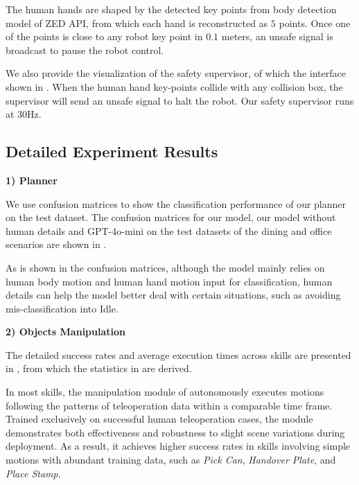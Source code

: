 The human hands are shaped by the detected key points from body detection model of ZED API, from which each hand is reconstructed as $5$ points.
Once one of the points is close to any robot key point in $0.1$ meters, an unsafe signal is broadcast to pause the robot control.

We also provide the visualization of the safety supervisor, of which the interface shown in . When the human hand key-points collide with any collision box, the supervisor will send an unsafe signal to halt the robot.
Our safety supervisor runs at $30$Hz.


\subsection{Detailed Experiment Results}

\label{app:result}

\noindent\textbf{1) Planner}

We use confusion matrices to show the classification performance of our planner on the test dataset. The confusion matrices for our model, our model without human details and GPT-4o-mini on the test datasets of the dining and office scenarios are shown in . 

As is shown in the confusion matrices, although the model mainly relies on human body motion and human hand motion input for classification, human details can help the model better deal with certain situations, such as avoiding mis-classification into Idle.

\noindent\textbf{2) Objects Manipulation}

The detailed success rates and average execution times across skills are presented in , from which the statistics in  are derived.

In most skills, the manipulation module of \our autonomously executes motions following the patterns of teleoperation data within a comparable time frame.
Trained exclusively on successful human teleoperation cases, the module demonstrates both effectiveness and robustness to slight scene variations during deployment. 
As a result, it achieves higher success rates in skills involving simple motions with abundant training data, such as \textit{Pick Can}, \textit{Handover Plate}, and \textit{Place Stamp}.

